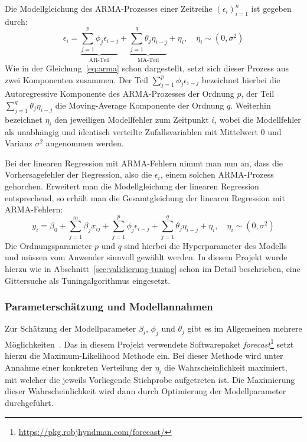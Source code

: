 Die Modellgleichung des ARMA-Prozesses einer Zeitreihe $(\epsilon_i)_{i=1}^n$ ist gegeben durch:
\begin{equation}
\label{eq:arma}
    \epsilon_i = \underbrace{\sum_{j=1}^p \phi_j \epsilon_{i-j}}_\text{AR-Teil} + 
        \underbrace{\sum_{j=1}^q \theta_j \eta_{i-j}}_\text{MA-Teil} + \eta_i, \quad \eta_i \sim (0, \sigma^2)
\end{equation}
Wie in der Gleichung~\ref{eq:arma} schon dargestellt, setzt sich dieser Prozess aus zwei Komponenten zusammen.
Der Teil $\sum_{j=1}^p \phi_j \epsilon_{i-j}$ bezeichnet hierbei die Autoregressive Komponente des ARMA-Prozesses der Ordnung $p$,
der Teil $\sum_{j=1}^q \theta_j \eta_{i-j}$ die Moving-Average Komponente der Ordnung $q$.
Weiterhin bezeichnet $\eta_i$ den jeweiligen Modellfehler zum Zeitpunkt $i$, wobei die Modellfehler als unabh\"angig und identisch
verteilte Zufallsvariablen mit Mittelwert 0 und Varianz $\sigma^2$ angenommen werden.

Bei der linearen Regression mit ARMA-Fehlern nimmt man nun an, dass die Vorhersagefehler der Regression, also die $\epsilon_i$,
einem solchen ARMA-Prozess gehorchen.
Erweitert man die Modellgleichung der linearen Regression entsprechend, so erh\"alt man die Gesamtgleichung der linearen Regression
mit ARMA-Fehlern:
\begin{equation}
    y_i = \beta_0 + \sum_{j=1}^m \beta_j x_{ij} + \sum_{j=1}^p \phi_j \epsilon_{i-j} + 
        \sum_{j=1}^q \theta_j \eta_{i-j} + \eta_i, \quad \eta_i \sim (0, \sigma^2)
\end{equation}
Die Ordnungsparameter $p$ und $q$ sind hierbei die Hyperparameter des Modells und m\"ussen vom Anwender sinnvoll gew\"ahlt werden.
In diesem Projekt wurde hierzu wie in Abschnitt~\ref{sec:validierung-tuning} schon im Detail beschrieben, eine Gittersuche als
Tuningalgorithmus eingesetzt.

\subsubsection{Parametersch\"atzung und Modellannahmen}

Zur Sch\"atzung der Modellparameter $\beta_i$, $\phi_j$ und $\theta_j$ gibt es im Allgemeinen mehrere M\"oglichkeiten~\cite{forecasting}.
Das in diesem Projekt verwendete Softwarepaket \textit{forecast}\footnote{\url{https://pkg.robjhyndman.com/forecast/}} setzt
hierzu die Maximum-Likelihood Methode ein.
Bei dieser Methode wird unter Annahme einer konkreten Verteilung der $\eta_i$ die Wahrscheinlichkeit maximiert, mit welcher
die jeweils Vorliegende Stichprobe aufgetreten ist. Die Maximierung dieser Wahrscheinlichkeit wird dann durch
Optimierung der Modellparameter durchgef\"uhrt.


